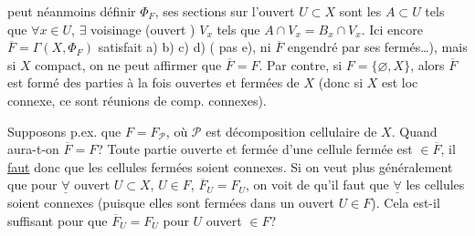 peut néanmoins définir $\Phi_F$, ses sections sur l'ouvert $U\subset X$ sont les $A\subset U$ tels que $\forall x\in U$, $\exists$ voisinage (ouvert ) $V_x$  tels que $A\cap V_x=B_x\cap V_x$. Ici encore $\overline F=\Gamma(X,\Phi_F)$  satisfait a) b) c) d) ( pas e), ni $\overline F$ engendré par ses fermés\ldots), mais  si $X$ compact, on ne peut affirmer que  $\overline F=F$. Par contre, si $F=\{\varnothing,X\}$, alors $\overline F$ est formé des parties à la fois ouvertes et fermées de $X$ (donc si $X$ est loc connexe, ce sont  réunions de comp. connexes).


Supposons p.ex. que $F=F_{\mathcal P}$, où $\mathcal P$ est décomposition cellulaire de $X$. Quand aura-t-on $\overline F=F$? Toute partie ouverte et fermée d'une cellule fermée est $\in\overline F$, il \uline{faut} donc que les cellules fermées soient connexes. Si on veut plus généralement que pour $\underline{\forall}$ ouvert $U\subset X$, $U\in F$, $\overline F_U=F_U$, on voit de  qu'il faut que $\underline{\forall}$ les cellules soient connexes (puisque elles sont fermées dans un ouvert $U\in F$). Cela est-il suffisant pour que $\overline F_U=F_U$ pour  $U$ ouvert $\in F$?
